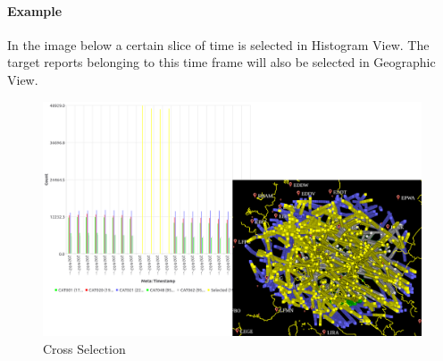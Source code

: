 \paragraph*{Example} In the image below a certain slice of time is selected in Histogram View. 
The target reports belonging to this time frame will also be selected in Geographic View.

\begin{figure}[H]
    \center
        \hspace*{-2.5cm}
    \includegraphics[width=19cm]{figures/cross_selection.png}
  \caption{Cross Selection}
\end{figure}
